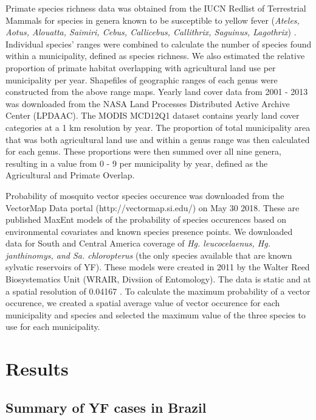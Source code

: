 \documentclass{article}
\begin{document}
Primate species richness data was obtained from the IUCN Redlist of Terrestrial Mammals for species in genera known to be susceptible to yellow fever (\textit{Ateles, Aotus, Alouatta, Saimiri, Cebus, Callicebus, Callithrix, Saguinus, Lagothrix}) \cite{bicca-marques2010,hamrick2017}. Individual species' ranges were combined to calculate the number of species found within a municipality, defined as species richness. We also estimated the relative proportion of primate habitat overlapping with agricultural land use per municipality per year. Shapefiles of geographic ranges of each genus were constructed from the above range maps. Yearly land cover data from 2001 - 2013 was downloaded from the NASA Land Processes Distributed Active Archive Center (LPDAAC). The MODIS MCD12Q1 dataset contains yearly land cover categories at a 1 km resolution by year. The proportion of total municipality area that was both agricultural land use and within a genus range was then calculated for each genus.  These proportions were then summed over all nine genera, resulting in a value from 0 - 9 per municipality by year, defined as the Agricultural and Primate Overlap.

Probability of mosquito vector species occurence was downloaded from the VectorMap Data portal (http://vectormap.si.edu/) on May 30 2018. These are published MaxEnt models of the probability of species occurences based on environmental covariates and known species presence points. We downloaded data for South and Central America coverage of \textit{Hg. leucocelaenus, Hg. janthinomys, and Sa. chloropterus} (the only species available that are known sylvatic reservoirs of YF). These models were
created in 2011 by the Walter Reed Biosystematics Unit (WRAIR, Divsiion of Entomology). The data is static and at a spatial resolution of 0.04167 \degree. To calculate the maximum probability of a vector occurence, we created a spatial average value of vector occurence for each municipality and species and selected the maximum value of the three species to use for each municipality.

\section*{Results}

\subsection*{Summary of YF cases in Brazil}
\end{document}
